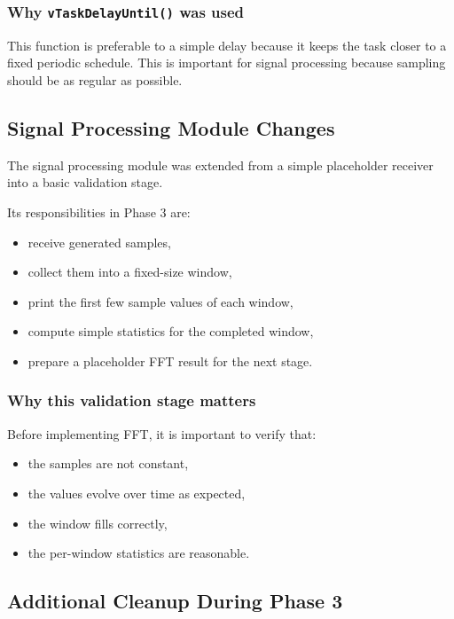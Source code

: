 \documentclass[12pt,a4paper]{article}
\begin{document}
\subsubsection*{Why \texttt{vTaskDelayUntil()} was used}

This function is preferable to a simple delay because it keeps the task closer
to a fixed periodic schedule. This is important for signal processing because
sampling should be as regular as possible.

\subsection{Signal Processing Module Changes}

The signal processing module was extended from a simple placeholder receiver
into a basic validation stage.

Its responsibilities in Phase 3 are:

\begin{itemize}
    \item receive generated samples,
    \item collect them into a fixed-size window,
    \item print the first few sample values of each window,
    \item compute simple statistics for the completed window,
    \item prepare a placeholder FFT result for the next stage.
\end{itemize}

\subsubsection*{Why this validation stage matters}

Before implementing FFT, it is important to verify that:

\begin{itemize}
    \item the samples are not constant,
    \item the values evolve over time as expected,
    \item the window fills correctly,
    \item the per-window statistics are reasonable.
\end{itemize}

\subsection{Additional Cleanup During Phase 3}
\end{document}
